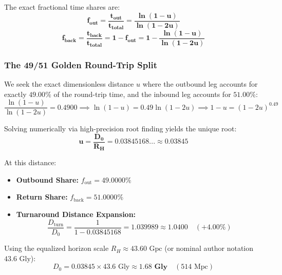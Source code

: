 \documentclass[11pt,a4paper]{article}
\begin{document}
The exact fractional time shares are:
\begin{equation}
\mathbf{f_{\text{out}} = \frac{t_{\text{out}}}{t_{\text{total}}} = \frac{\ln(1 - u)}{\ln(1 - 2u)}}
\label{eq:f_out_share}
\end{equation}
\begin{equation}
\mathbf{f_{\text{back}} = \frac{t_{\text{back}}}{t_{\text{total}}} = 1 - f_{\text{out}} = 1 - \frac{\ln(1 - u)}{\ln(1 - 2u)}}
\label{eq:f_back_share}
\end{equation}

\subsubsection{The 49/51 Golden Round-Trip Split}

We seek the exact dimensionless distance $u$ where the outbound leg accounts for exactly $49.00\%$ of the round-trip time, and the inbound leg accounts for $51.00\%$:
\begin{equation}
\frac{\ln(1 - u)}{\ln(1 - 2u)} = 0.4900 \implies \ln(1 - u) = 0.49 \ln(1 - 2u) \implies 1 - u = (1 - 2u)^{0.49}
\end{equation}

Solving numerically via high-precision root finding yields the unique root:
\begin{equation}
\mathbf{u = \frac{D_0}{R_H} = 0.03845168... \approx 0.03845}
\label{eq:golden_split_root}
\end{equation}

At this distance:
\begin{itemize}
    \item \textbf{Outbound Share:} $f_{\text{out}} = 49.0000\%$
    \item \textbf{Return Share:} $f_{\text{back}} = 51.0000\%$
    \item \textbf{Turnaround Distance Expansion:}
    \begin{equation}
    \frac{D_{\text{turn}}}{D_0} = \frac{1}{1 - 0.03845168} = \mathbf{1.039989 \approx 1.0400} \quad (+4.00\%)
    \end{equation}
\end{itemize}

Using the equalized horizon scale $R_H \approx 43.60\text{ Gpc}$ (or nominal author notation $43.6\text{ Gly}$):
\begin{equation}
D_0 = 0.03845 \times 43.6\text{ Gly} \approx \mathbf{1.68\text{ Gly}} \quad (514\text{ Mpc})
\end{equation}
\end{document}
